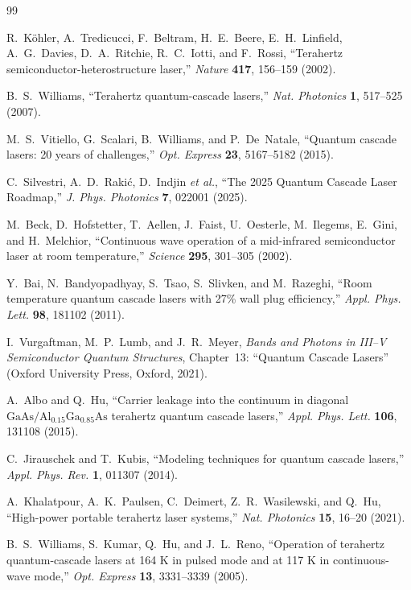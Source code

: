 \documentclass[11pt,letterpaper]{article}
\begin{document}
\begin{thebibliography}{99}

R.~K\"ohler, A.~Tredicucci, F.~Beltram, H.~E.~Beere, E.~H.~Linfield, A.~G.~Davies, D.~A.~Ritchie, R.~C.~Iotti, and F.~Rossi, ``Terahertz semiconductor-heterostructure laser,'' \textit{Nature} \textbf{417}, 156--159 (2002).

B.~S.~Williams, ``Terahertz quantum-cascade lasers,'' \textit{Nat. Photonics} \textbf{1}, 517--525 (2007).

M.~S.~Vitiello, G.~Scalari, B.~Williams, and P.~De~Natale, ``Quantum cascade lasers: 20 years of challenges,'' \textit{Opt. Express} \textbf{23}, 5167--5182 (2015).

C.~Silvestri, A.~D.~Raki\'c, D.~Indjin \textit{et al.}, ``The 2025 Quantum Cascade Laser Roadmap,'' \textit{J. Phys. Photonics} \textbf{7}, 022001 (2025).

M.~Beck, D.~Hofstetter, T.~Aellen, J.~Faist, U.~Oesterle, M.~Ilegems, E.~Gini, and H.~Melchior, ``Continuous wave operation of a mid-infrared semiconductor laser at room temperature,'' \textit{Science} \textbf{295}, 301--305 (2002).

Y.~Bai, N.~Bandyopadhyay, S.~Tsao, S.~Slivken, and M.~Razeghi, ``Room temperature quantum cascade lasers with 27\% wall plug efficiency,'' \textit{Appl. Phys. Lett.} \textbf{98}, 181102 (2011).

I.~Vurgaftman, M.~P.~Lumb, and J.~R.~Meyer, \textit{Bands and Photons in III--V Semiconductor Quantum Structures}, Chapter~13: ``Quantum Cascade Lasers'' (Oxford University Press, Oxford, 2021).

A.~Albo and Q.~Hu, ``Carrier leakage into the continuum in diagonal $\mathrm{GaAs}/\mathrm{Al}_{0.15}\mathrm{Ga}_{0.85}\mathrm{As}$ terahertz quantum cascade lasers,'' \textit{Appl. Phys. Lett.} \textbf{106}, 131108 (2015).

C.~Jirauschek and T.~Kubis, ``Modeling techniques for quantum cascade lasers,'' \textit{Appl. Phys. Rev.} \textbf{1}, 011307 (2014).

A.~Khalatpour, A.~K.~Paulsen, C.~Deimert, Z.~R.~Wasilewski, and Q.~Hu, ``High-power portable terahertz laser systems,'' \textit{Nat. Photonics} \textbf{15}, 16--20 (2021).

B.~S.~Williams, S.~Kumar, Q.~Hu, and J.~L.~Reno, ``Operation of terahertz quantum-cascade lasers at 164 K in pulsed mode and at 117 K in continuous-wave mode,'' \textit{Opt. Express} \textbf{13}, 3331--3339 (2005).


\end{thebibliography}
\end{document}
